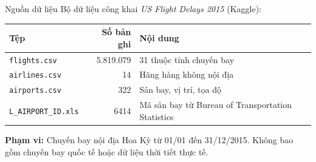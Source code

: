 \begin{frame}{Nguồn dữ liệu}
Bộ dữ liệu công khai \textit{US Flight Delays 2015} (Kaggle):

\vspace{2mm}
\begin{table}
\centering
\small\slideTablePad
\begin{tabular}{|l|r|l|}
\hline
\textbf{Tệp} & \textbf{Số bản ghi} & \textbf{Nội dung} \\
\hline
\texttt{flights.csv}  & 5.819.079 & 31 thuộc tính chuyến bay \\
\hline
\texttt{airlines.csv}  & 14 & Hãng hàng không nội địa \\
\hline
\texttt{airports.csv}  & 322 & Sân bay, vị trí, tọa độ \\
\hline
\texttt{L\_AIRPORT\_ID.xls} & 6414 & Mã sân bay từ Bureau of Transportation Statistics \\
\hline
\end{tabular}
\end{table}

\vspace{2mm}
\textbf{Phạm vi:} Chuyến bay nội địa Hoa Kỳ từ 01/01 đến 31/12/2015.
Không bao gồm chuyến bay quốc tế hoặc dữ liệu thời tiết thực tế.
\end{frame}
